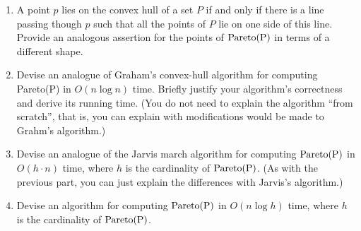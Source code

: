 \documentclass[11pt]{article}
\newcommand{\pareto}[1]{\rm{Pareto}(#1)}
\begin{document}
\begin{enumerate}

\item A point $p$ lies on the convex hull of a set $P$ if and only if there is
a line passing though $p$ such that all the points of $P$ lie on one side of
this line.  Provide an analogous assertion for the points of $\pareto{P}$ in
terms of a different shape.

\item Devise an analogue of Graham's convex-hull algorithm for computing
\pareto{P} in $O(n \log n)$ time.  Briefly justify your algorithm's correctness
and derive its running time.  (You do not need to explain the algorithm ``from
scratch'', that is, you can explain with modifications would be made to Grahm's
algorithm.)

\item Devise an analogue of the Jarvis march algorithm for computing
$\pareto{P}$ in $O(h \cdot n)$ time, where $h$ is the cardinality of
$\pareto{P}$.  (As with the previous part, you can just explain the differences
with Jarvis's algorithm.)

\item Devise an algorithm for computing $\pareto{P}$ in $O(n
\log h)$ time, where $h$ is the cardinality of $\pareto{P}$.

\end{enumerate}
\end{document}
